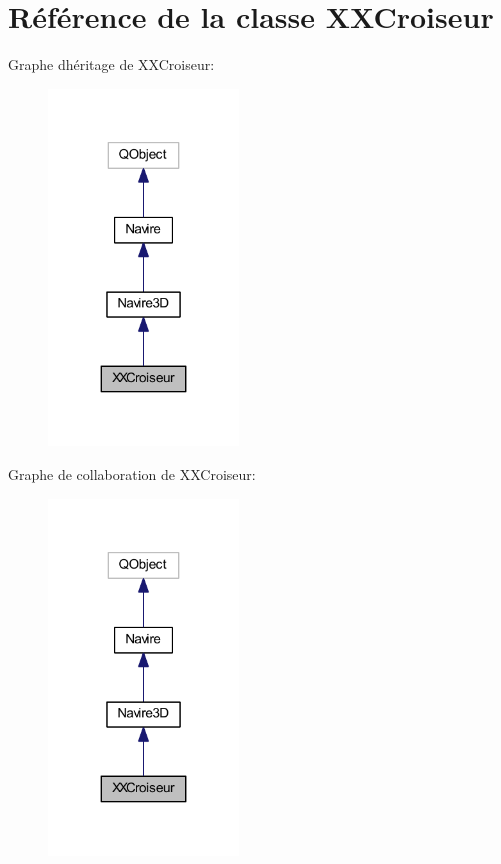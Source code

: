 \hypertarget{class_x_x_croiseur}{}\section{Référence de la classe X\+X\+Croiseur}
\label{class_x_x_croiseur}


Graphe d\textquotesingle{}héritage de X\+X\+Croiseur\+:
\nopagebreak
\begin{figure}[H]
\begin{center}
\leavevmode
\includegraphics[width=143pt]{class_x_x_croiseur__inherit__graph}
\end{center}
\end{figure}


Graphe de collaboration de X\+X\+Croiseur\+:
\nopagebreak
\begin{figure}[H]
\begin{center}
\leavevmode
\includegraphics[width=143pt]{class_x_x_croiseur__coll__graph}
\end{center}
\end{figure}
